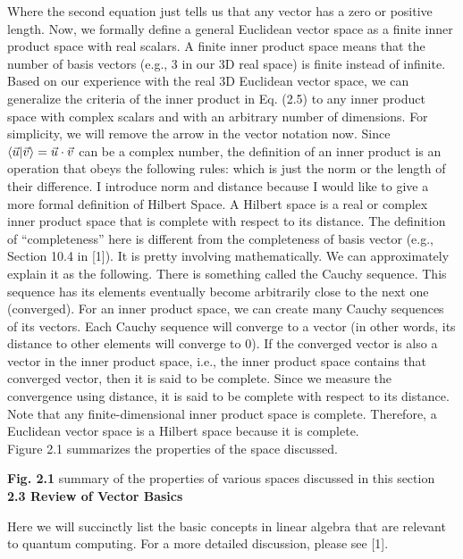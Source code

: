 \documentclass{article}
\begin{document}
Where the second equation just tells us that any vector has a zero or positive length.
Now, we formally define a general Euclidean vector space as a finite inner product space with real scalars. A finite inner product space means that the number of basis vectors (e.g., 3 in our 3D real space) is finite instead of infinite.
Based on our experience with the real 3D Euclidean vector space, we can generalize the criteria of the 
inner product in Eq. (2.5) to any inner product space with complex scalars and with an arbitrary number of dimensions. 
For simplicity, we will remove the arrow in the vector notation now. Since $\braket{\vec{u}|\vec{v}}=\vec{u}\cdot\vec{v}$
can be a complex number, the definition of an inner product is an operation that obeys the following rules:
which is just the norm or the length of their difference.
I introduce norm and distance because I would like to give a more formal definition of Hilbert Space. A Hilbert space is a real or complex inner product space that is complete with respect to its distance. The definition of “completeness” here is different from the completeness of basis vector (e.g., Section 10.4 in [1]). It is pretty involving mathematically. We can approximately explain it as the following. There is something called the Cauchy sequence. This sequence has its elements eventually become arbitrarily close to the next one (converged). For an inner product space, we can create many Cauchy sequences of its vectors. Each Cauchy sequence will converge to a vector (in other words, its distance to other elements will converge to 0). If the converged vector is also a vector in the inner product space, i.e., the inner product space contains that converged vector, then it is said to be complete. Since we measure the convergence using distance, it is said to be complete with respect to its distance.
Note that any finite-dimensional inner product space is complete. Therefore, a Euclidean vector space is a Hilbert space because it is complete.\\[20pt]
Figure 2.1 summarizes the properties of the space discussed.








\textbf{Fig. 2.1} summary of the properties of various spaces discussed in this section
\\[30pt]
\textbf{\large 2.3 Review of Vector Basics}

Here we will succinctly list the basic concepts in linear algebra that are relevant to quantum computing. For a more detailed discussion, please see [1].
\end{document}
